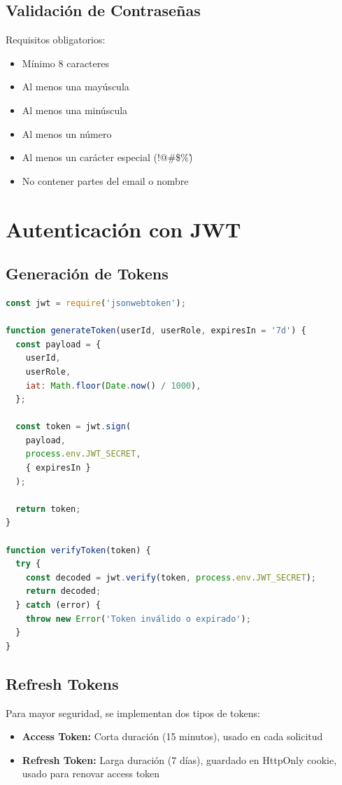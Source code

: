 \documentclass[a4paper]{report}
\begin{document}
\subsection{Validación de Contraseñas}

Requisitos obligatorios:

\begin{itemize}
  \item Mínimo 8 caracteres
  \item Al menos una mayúscula
  \item Al menos una minúscula
  \item Al menos un número
  \item Al menos un carácter especial (!@\#\$\%\^)
  \item No contener partes del email o nombre
\end{itemize}

\section{Autenticación con JWT}

\subsection{Generación de Tokens}

\begin{lstlisting}[language=JavaScript,
  caption={Creación de JWT}]
const jwt = require('jsonwebtoken');

function generateToken(userId, userRole, expiresIn = '7d') {
  const payload = {
    userId,
    userRole,
    iat: Math.floor(Date.now() / 1000),
  };
  
  const token = jwt.sign(
    payload,
    process.env.JWT_SECRET,
    { expiresIn }
  );
  
  return token;
}

function verifyToken(token) {
  try {
    const decoded = jwt.verify(token, process.env.JWT_SECRET);
    return decoded;
  } catch (error) {
    throw new Error('Token inválido o expirado');
  }
}
\end{lstlisting}

\subsection{Refresh Tokens}

Para mayor seguridad, se implementan dos tipos de tokens:

\begin{itemize}
  \item \textbf{Access Token:} Corta duración (15 minutos), usado en cada solicitud
  \item \textbf{Refresh Token:} Larga duración (7 días), guardado en HttpOnly cookie, usado para renovar access token
\end{itemize}
\end{document}
